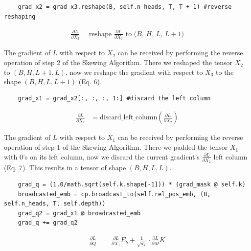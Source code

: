 \documentclass[a4paper,12pt]{extarticle}
\begin{document}
\begin{lstlisting}
    grad_x2 = grad_x3.reshape(B, self.n_heads, T, T + 1) #reverse reshaping
\end{lstlisting}
\begin{align}
\frac{\partial L}{\partial X_2}=\text{reshape } \frac{\partial L}{\partial X_3} \text{ to ($B$, $H$, $L$, $L + 1$)}
\end{align}

The gradient of $L$ with respect to $X_2$ can be received by performing the reverse operation of step 2 of the Skewing Algorithm. There we reshaped the tensor $X_2$ to $(B, H, L + 1, L)$, now we reshape the gradient with respect to $X_3$ to the shape $(B, H, L, L + 1)$ (Eq. 6).\newline
\vspace{0.1 cm}

\begin{lstlisting}
    grad_x1 = grad_x2[:, :, :, 1:] #discard the left column
\end{lstlisting}
\begin{align}
\frac{\partial L}{\partial X_1}&=\text{discard\_left\_column}\left(\frac{\partial L}{\partial X_2}\right)
\end{align}

The gradient of $L$ with respect to $X_1$ can be received by performing the reverse operation of step 1 of the Skewing Algorithm. There we padded the tensor $X_1$ with 0's on its left column, now we discard the current gradient's $\frac{\partial L}{\partial X_2}$ left column (Eq. 7). This results in a tensor of shape $(B, H, L, L)$.\newline
\vspace{0.1 cm}


\begin{lstlisting}
    grad_q = (1.0/math.sqrt(self.k.shape[-1])) * (grad_mask @ self.k)
    broadcasted_emb = cp.broadcast_to(self.rel_pos_emb, (B, self.n_heads, T, self.depth))
    grad_q2 = grad_x1 @ broadcasted_emb
    grad_q += grad_q2
\end{lstlisting}
\begin{align}
\frac{\partial L}{\partial Q}
&= \frac{\partial L}{\partial X_1}E_b + \frac{1}{\sqrt{d_k}} \cdot\frac{\partial L}{\partial M}K
\end{align}
\end{document}
